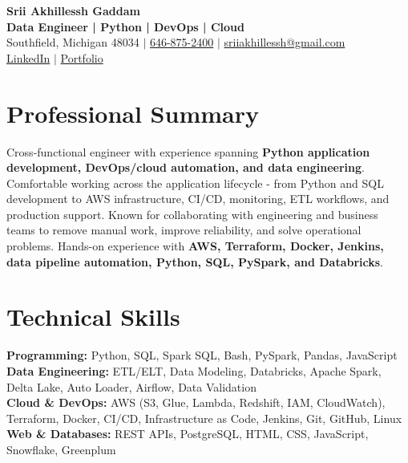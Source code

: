 \documentclass[letterpaper,10pt]{article}
\begin{document}
\fontsize{9.35pt}{10.45pt}\selectfont

\begin{center}
    {\LARGE \textbf{Srii Akhillessh Gaddam}} \\[-1pt]
    \textbf{Data Engineer | Python | DevOps | Cloud} \\[2pt]
    Southfield, Michigan 48034 $|$
    \href{tel:6468752400}{646-875-2400} $|$
    \href{mailto:sriiakhillessh@gmail.com}{sriiakhillessh@gmail.com} \\[1pt]
    \href{https://www.linkedin.com/in/srii-akhiilessh-gaddam-b48668191/}{LinkedIn} $|$
    \href{https://sriiakhillesshg.github.io/portfolio/}{Portfolio}
\end{center}
\vspace{-8pt}

\section{Professional Summary}
\small{Cross-functional engineer with experience spanning \textbf{Python application development, DevOps/cloud automation, and data engineering}. Comfortable working across the application lifecycle - from Python and SQL development to AWS infrastructure, CI/CD, monitoring, ETL workflows, and production support. Known for collaborating with engineering and business teams to remove manual work, improve reliability, and solve operational problems. Hands-on experience with \textbf{AWS, Terraform, Docker, Jenkins, data pipeline automation, Python, SQL, PySpark, and Databricks}.}

\section{Technical Skills}
\small{
\textbf{Programming:} Python, SQL, Spark SQL, Bash, PySpark, Pandas, JavaScript \\
\textbf{Data Engineering:} ETL/ELT, Data Modeling, Databricks, Apache Spark, Delta Lake, Auto Loader, Airflow, Data Validation \\
\textbf{Cloud \& DevOps:} AWS (S3, Glue, Lambda, Redshift, IAM, CloudWatch), Terraform, Docker, CI/CD, Infrastructure as Code, Jenkins, Git, GitHub, Linux \\
\textbf{Web \& Databases:} REST APIs, PostgreSQL, HTML, CSS, JavaScript, Snowflake, Greenplum
}
\end{document}
